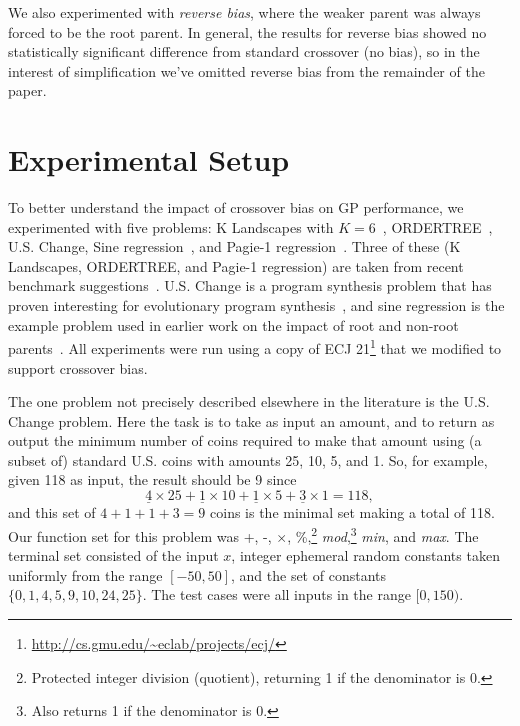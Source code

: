 \documentclass{sig-alternate}
\begin{document}
We also experimented with \emph{reverse bias}, where the weaker parent was always forced to be the root parent. In
general, the results for reverse bias showed no statistically significant difference from standard crossover (no bias),
so in the interest of simplification we've omitted reverse bias from the remainder of the paper.

\section{Experimental Setup} \label{sec:Experiments}

To better understand the impact of crossover bias on GP performance, we experimented with five problems: K Landscapes
with $K=6$~\cite{vanneschi2011k}, ORDER\-TREE~\cite{hoang2006ordertree}, U.S. Change, Sine
regression~\cite{poli08:fieldguide}, and Pagie-1 regression~\cite{pagie1997evolutionary}. Three of these (K Landscapes,
ORDERTREE, and Pagie-1 regression) are taken from recent benchmark suggestions~\cite{gp-benchmarks-2013}. U.S. Change
is a program synthesis problem  that has proven interesting for evolutionary program
synthesis~\cite{zhan2014quantitative}, and sine regression is the example problem used in earlier work on the impact of
root and non-root parents~\cite{McPheeDonatucciDramdahl:2014}. 
All experiments were run using a copy of ECJ 21\footnote{\url{http://cs.gmu.edu/~eclab/projects/ecj/}} that we modified
to support crossover bias.

The one problem not precisely described elsewhere in the literature is the U.S. Change problem. Here the task is to
take as input an amount, and to return as output the minimum number of coins required to make that amount using (a
subset of) standard U.S. coins with amounts 25, 10, 5, and 1. So, for example, given 118 as input, the result should be
9 since 
\[
	\underline{4} \times 25 + \underline{1} \times 10 + \underline{1} \times 5 + \underline{3} \times 1 = 118,
\]
and this set of $4+1+1+3 = 9$ coins is the minimal set making a total of 118. Our function set for this problem was +,
-, $\times$, \%,\footnote{Protected integer division (quotient), returning 1 if the denominator is 0.} \emph{mod},\footnote{Also returns 1 if the denominator is 0.}
\emph{min}, and \emph{max}. The terminal set consisted of the input $x$, integer ephemeral random constants taken
uniformly from the range $[-50, 50]$, and the set of constants $\{ 0, 1, 4, 5, 9, 10, 24, 25 \}$. The test cases were
all inputs in the range $[0, 150)$.

\end{document}
